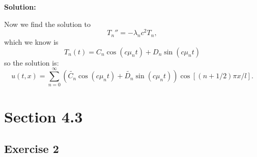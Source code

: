 \documentclass{article}
\begin{document}
\textbf{Solution:}

Now we find the solution to
\[
    T_n''=-\lambda_nc^2T_n,
\]
which we know is
\[
T_n(t)=C_n\cos(c\mu_n t) + D_n\sin(c\mu_n t)
\]
so the solution is:
\[
u(t,x)=\sum_{n=0}^\infty \left(\widetilde{C_n}\cos(c\mu_n t) +
    \widetilde{D_n}\sin(c\mu_n t)\right)\cos\left[\left(n+1/2\right)\pi
x/l\right].
\]
\section{Section 4.3}
\subsection{Exercise 2}
\end{document}
